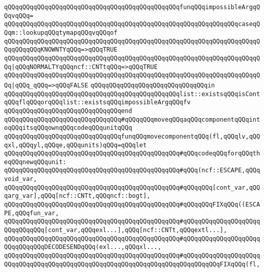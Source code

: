 \verb|qQQqqQQqqQQqqQQqqQQqqQQqqQQqqQQqqQQqqQQqqQQqqQQqfunqQQqimpossibleArgqQQqvqQQq=|\newline
\verb|qQQqqQQqqQQqqQQqqQQqqQQqqQQqqQQqqQQqqQQqqQQqqQQqqQQqqQQqqQQqqQQqcaseqQQqm::lookupqQQqtymapqQQqvqQQqof|\newline
\verb|qQQqqQQqqQQqqQQqqQQqqQQqqQQqqQQqqQQqqQQqqQQqqQQqqQQqqQQqqQQqqQQqqQQqqQQqqQQqqQQqKNOWNTYqQQq=>qQQqTRUE|\newline
\verb|qQQqqQQqqQQqqQQqqQQqqQQqqQQqqQQqqQQqqQQqqQQqqQQqqQQqqQQqqQQqqQQqqQQqqQQq|\verb#|qQQqNORMALTYqQQqncf::CNTtqQQq=>qQQqTRUE#\newline
\verb|qQQqqQQqqQQqqQQqqQQqqQQqqQQqqQQqqQQqqQQqqQQqqQQqqQQqqQQqqQQqqQQqqQQqqQQq|\verb#|qQQq_qQQq=>qQQqFALSE#\newline
\verb|qQQqqQQqqQQqqQQqqQQqqQQqqQQqqQQqin|\newline
\verb|qQQqqQQqqQQqqQQqqQQqqQQqqQQqqQQqqQQqqQQqqQQqqQQqlist::existsqQQqisContqQQqflqQQqorqQQqlist::existsqQQqimpossibleArgqQQqfv|\newline
\verb|qQQqqQQqqQQqqQQqqQQqqQQqqQQqqQQqend|\newline
\newline
\verb|qQQqqQQqqQQqqQQqqQQqqQQqqQQqqQQq#qQQqqQQqmoveqQQqaqQQqcomponentqQQqintoqQQqitsqQQqownqQQqcodeqQQqunitqQQq|\newline
\verb|qQQqqQQqqQQqqQQqqQQqqQQqqQQqqQQqfunqQQqmovecomponentqQQq(fl,qQQqlv,qQQqxl,qQQqyl,qQQqe,qQQqunits)qQQq=qQQqlet|\newline
\newline
\verb|qQQqqQQqqQQqqQQqqQQqqQQqqQQqqQQqqQQqqQQqqQQqqQQq#qQQqcodeqQQqforqQQqtheqQQqnewqQQqunit:|\newline
\verb|qQQqqQQqqQQqqQQqqQQqqQQqqQQqqQQqqQQqqQQqqQQqqQQq#qQQq(ncf::ESCAPE,qQQqvoid_var,|\newline
\verb|qQQqqQQqqQQqqQQqqQQqqQQqqQQqqQQqqQQqqQQqqQQqqQQq#qQQqqQQq[cont_var,qQQqarg_var],qQQq[ncf::CNTt,qQQqncf::bogt],|\newline
\verb|qQQqqQQqqQQqqQQqqQQqqQQqqQQqqQQqqQQqqQQqqQQqqQQq#qQQqqQQqFIXqQQq((ESCAPE,qQQqfun_var,|\newline
\verb|qQQqqQQqqQQqqQQqqQQqqQQqqQQqqQQqqQQqqQQqqQQqqQQq#qQQqqQQqqQQqqQQqqQQqqQQqqQQqqQQq[cont_var,qQQqexl...],qQQq[ncf::CNTt,qQQqextl...],|\newline
\verb|qQQqqQQqqQQqqQQqqQQqqQQqqQQqqQQqqQQqqQQqqQQqqQQq#qQQqqQQqqQQqqQQqqQQqqQQqqQQqqQQqDECODESENDqQQq(exl...,qQQqxl...,|\newline
\verb|qQQqqQQqqQQqqQQqqQQqqQQqqQQqqQQqqQQqqQQqqQQqqQQq#qQQqqQQqqQQqqQQqqQQqqQQqqQQqqQQqqQQqqQQqqQQqqQQqqQQqqQQqqQQqqQQqqQQqqQQqqQQqqQQqFIXqQQq(fl,|\newline
